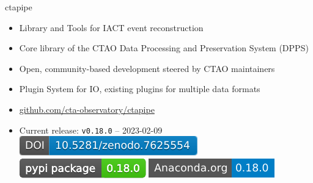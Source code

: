 \documentclass[aspectratio=1610, 9pt]{beamer}
\begin{document}
\begin{frame}{ctapipe}
  \begin{itemize}
    \item Library and Tools for IACT event reconstruction
    \item Core library of the CTAO Data Processing and Preservation System (DPPS)
    \item Open, community-based development steered by CTAO maintainers
    \item Plugin System for IO, existing plugins for multiple data formats
    \item \href{https://github.com/cta-observatory/ctapipe}{github.com/cta-observatory/ctapipe}
    \item Current release: \texttt{v0.18.0} – 2023-02-09
      \href{https://doi.org/10.5281/zenodo.3372210}{\includegraphics[height=2ex]{images/ctapipe_zenodo.pdf}}
      \href{https://pypi.org/project/ctapipe}{\includegraphics[height=2ex]{images/ctapipe_pypi.pdf}}
      \href{https://anaconda.org/conda-forge/ctapipe}{\includegraphics[height=2ex]{images/ctapipe_conda.pdf}}
  \end{itemize}
\end{frame}

\begin{frame}
  
\end{frame}

\begin{frame}
  
\end{frame}
\end{document}
